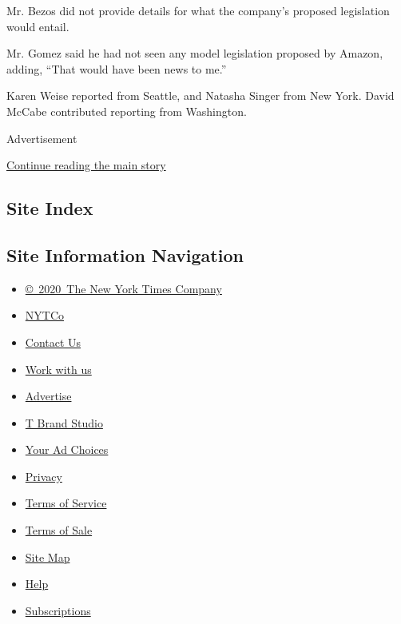 Mr. Bezos did not provide details for what the company's proposed
legislation would entail.

Mr. Gomez said he had not seen any model legislation proposed by Amazon,
adding, ``That would have been news to me.''

Karen Weise reported from Seattle, and Natasha Singer from New York.
David McCabe contributed reporting from Washington.

Advertisement

\protect\hyperlink{after-bottom}{Continue reading the main story}

\hypertarget{site-index}{%
\subsection{Site Index}\label{site-index}}

\hypertarget{site-information-navigation}{%
\subsection{Site Information
Navigation}\label{site-information-navigation}}

\begin{itemize}
\tightlist
\item
  \href{https://help.nytimes3xbfgragh.onion/hc/en-us/articles/115014792127-Copyright-notice}{©~2020~The
  New York Times Company}
\end{itemize}

\begin{itemize}
\tightlist
\item
  \href{https://www.nytco.com/}{NYTCo}
\item
  \href{https://help.nytimes3xbfgragh.onion/hc/en-us/articles/115015385887-Contact-Us}{Contact
  Us}
\item
  \href{https://www.nytco.com/careers/}{Work with us}
\item
  \href{https://nytmediakit.com/}{Advertise}
\item
  \href{http://www.tbrandstudio.com/}{T Brand Studio}
\item
  \href{https://www.nytimes3xbfgragh.onion/privacy/cookie-policy\#how-do-i-manage-trackers}{Your
  Ad Choices}
\item
  \href{https://www.nytimes3xbfgragh.onion/privacy}{Privacy}
\item
  \href{https://help.nytimes3xbfgragh.onion/hc/en-us/articles/115014893428-Terms-of-service}{Terms
  of Service}
\item
  \href{https://help.nytimes3xbfgragh.onion/hc/en-us/articles/115014893968-Terms-of-sale}{Terms
  of Sale}
\item
  \href{https://spiderbites.nytimes3xbfgragh.onion}{Site Map}
\item
  \href{https://help.nytimes3xbfgragh.onion/hc/en-us}{Help}
\item
  \href{https://www.nytimes3xbfgragh.onion/subscription?campaignId=37WXW}{Subscriptions}
\end{itemize}
